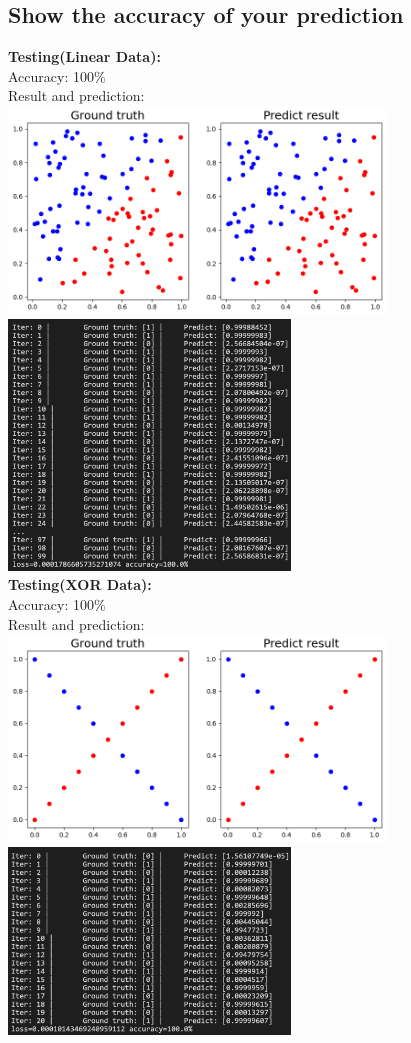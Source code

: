 \documentclass{article} %
\begin{document}
    \subsection{Show the accuracy of your prediction}
    \textbf{Testing(Linear Data):} \\
    Accuracy: 100\% \\
    Result and prediction: \\
    \includegraphics[width=10cm]{./imgs/linear_data.png} \\
    \includegraphics[width=7.5cm]{./imgs/linear_pred1.png} \\
    \textbf{Testing(XOR Data):} \\
    Accuracy: 100\% \\
    Result and prediction: \\
    \includegraphics[width=10cm]{./imgs/xor.png} \\ 
    \includegraphics[width=7.5cm]{./imgs/xor_pred1.png} \\
\end{document}
